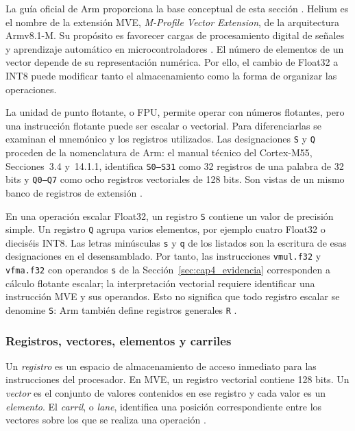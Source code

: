 La guía oficial de Arm proporciona la base conceptual de esta sección \cite{cap4_armcomplete}. Helium es el nombre de la extensión MVE, \textit{M-Profile Vector Extension}, de la arquitectura Armv8.1-M. Su propósito es favorecer cargas de procesamiento digital de señales y aprendizaje automático en microcontroladores \cite{cap4_armoverview}. El número de elementos de un vector depende de su representación numérica. Por ello, el cambio de Float32 a INT8 puede modificar tanto el almacenamiento como la forma de organizar las operaciones.

La unidad de punto flotante, o FPU, permite operar con números flotantes, pero una instrucción flotante puede ser escalar o vectorial. Para diferenciarlas se examinan el mnemónico y los registros utilizados. Las designaciones \texttt{S} y \texttt{Q} proceden de la nomenclatura de Arm: el manual técnico del Cortex-M55, Secciones~3.4 y~14.1.1, identifica \texttt{S0--S31} como 32 registros de una palabra de 32 bits y \texttt{Q0--Q7} como ocho registros vectoriales de 128 bits. Son vistas de un mismo banco de registros de extensión \cite{cap4_armtrm}.

En una operación escalar Float32, un registro \texttt{S} contiene un valor de precisión simple. Un registro \texttt{Q} agrupa varios elementos, por ejemplo cuatro Float32 o dieciséis INT8. Las letras minúsculas \texttt{s} y \texttt{q} de los listados son la escritura de esas designaciones en el desensamblado. Por tanto, las instrucciones \texttt{vmul.f32} y \texttt{vfma.f32} con operandos \texttt{s} de la Sección~\ref{sec:cap4_evidencia} corresponden a cálculo flotante escalar; la interpretación vectorial requiere identificar una instrucción MVE y sus operandos. Esto no significa que todo registro escalar se denomine \texttt{S}: Arm también define registros generales \texttt{R} \cite{cap4_armtrm}.

\subsubsection{Registros, vectores, elementos y carriles}
Un \emph{registro} es un espacio de almacenamiento de acceso inmediato para las instrucciones del procesador. En MVE, un registro vectorial contiene 128 bits. Un \emph{vector} es el conjunto de valores contenidos en ese registro y cada valor es un \emph{elemento}. El \emph{carril}, o \textit{lane}, identifica una posición correspondiente entre los vectores sobre los que se realiza una operación \cite{cap4_armregisters}.

